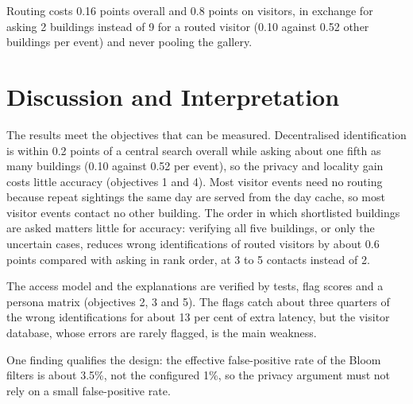 \documentclass[12pt,a4paper,oneside]{report}
\begin{document}
Routing costs 0.16 points overall and 0.8 points on visitors, in exchange for asking 2 buildings instead of 9 for a routed visitor (0.10 against 0.52 other buildings per event) and never pooling the gallery.

\section{Discussion and Interpretation}
The results meet the objectives that can be measured. Decentralised identification is within 0.2 points of a central search overall while asking about one fifth as many buildings (0.10 against 0.52 per event), so the privacy and locality gain costs little accuracy (objectives 1 and 4). Most visitor events need no routing because repeat sightings the same day are served from the day cache, so most visitor events contact no other building. The order in which shortlisted buildings are asked matters little for accuracy: verifying all five buildings, or only the uncertain cases, reduces wrong identifications of routed visitors by about 0.6 points compared with asking in rank order, at 3 to 5 contacts instead of 2.

The access model and the explanations are verified by tests, flag scores and a persona matrix (objectives 2, 3 and 5). The flags catch about three quarters of the wrong identifications for about 13 per cent of extra latency, but the visitor database, whose errors are rarely flagged, is the main weakness.

One finding qualifies the design: the effective false-positive rate of the Bloom filters is about 3.5\%, not the configured 1\%, so the privacy argument must not rely on a small false-positive rate.
\end{document}
